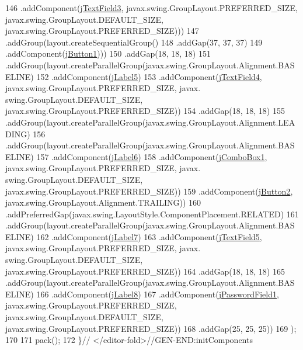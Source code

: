 \begin{DoxyCode}
146                             .addComponent(\mbox{\hyperlink{class_interfaz_package_1_1_interfaz_registro_a053413f2ec138bbb7914f22521b998f2}{jTextField3}}, javax.swing.GroupLayout.PREFERRED\_SIZE, 
      javax.swing.GroupLayout.DEFAULT\_SIZE, javax.swing.GroupLayout.PREFERRED\_SIZE)))
147                     .addGroup(layout.createSequentialGroup()
148                         .addGap(37, 37, 37)
149                         .addComponent(\mbox{\hyperlink{class_interfaz_package_1_1_interfaz_registro_a591a9233d6e086496804607414f1ccee}{jButton1}})))
150                 .addGap(18, 18, 18)
151                 .addGroup(layout.createParallelGroup(javax.swing.GroupLayout.Alignment.BASELINE)
152                     .addComponent(\mbox{\hyperlink{class_interfaz_package_1_1_interfaz_registro_a33ae73ec9abbf6e97467d9260b162c3e}{jLabel5}})
153                     .addComponent(\mbox{\hyperlink{class_interfaz_package_1_1_interfaz_registro_ac390d7bd629d29d59202c8b4fd60f46c}{jTextField4}}, javax.swing.GroupLayout.PREFERRED\_SIZE, javax.
      swing.GroupLayout.DEFAULT\_SIZE, javax.swing.GroupLayout.PREFERRED\_SIZE))
154                 .addGap(18, 18, 18)
155                 .addGroup(layout.createParallelGroup(javax.swing.GroupLayout.Alignment.LEADING)
156                     .addGroup(layout.createParallelGroup(javax.swing.GroupLayout.Alignment.BASELINE)
157                         .addComponent(\mbox{\hyperlink{class_interfaz_package_1_1_interfaz_registro_a49a5d1a1190e2cef3163a9b00fa76108}{jLabel6}})
158                         .addComponent(\mbox{\hyperlink{class_interfaz_package_1_1_interfaz_registro_a4c0ea8d0c8cbb3225b39b115bbd0416b}{jComboBox1}}, javax.swing.GroupLayout.PREFERRED\_SIZE, javax.
      swing.GroupLayout.DEFAULT\_SIZE, javax.swing.GroupLayout.PREFERRED\_SIZE))
159                     .addComponent(\mbox{\hyperlink{class_interfaz_package_1_1_interfaz_registro_aece6fd600c53e99fc2b9de62cfcbc0ae}{jButton2}}, javax.swing.GroupLayout.Alignment.TRAILING))
160                 .addPreferredGap(javax.swing.LayoutStyle.ComponentPlacement.RELATED)
161                 .addGroup(layout.createParallelGroup(javax.swing.GroupLayout.Alignment.BASELINE)
162                     .addComponent(\mbox{\hyperlink{class_interfaz_package_1_1_interfaz_registro_ad54a5088a93694070b1ff7162a917af7}{jLabel7}})
163                     .addComponent(\mbox{\hyperlink{class_interfaz_package_1_1_interfaz_registro_ad0d4eb99969584d92b6b857ad190d210}{jTextField5}}, javax.swing.GroupLayout.PREFERRED\_SIZE, javax.
      swing.GroupLayout.DEFAULT\_SIZE, javax.swing.GroupLayout.PREFERRED\_SIZE))
164                 .addGap(18, 18, 18)
165                 .addGroup(layout.createParallelGroup(javax.swing.GroupLayout.Alignment.BASELINE)
166                     .addComponent(\mbox{\hyperlink{class_interfaz_package_1_1_interfaz_registro_ab71462c00d6d77761293a3876adb4447}{jLabel8}})
167                     .addComponent(\mbox{\hyperlink{class_interfaz_package_1_1_interfaz_registro_af5d680c6a043e4e0a96fa3b93ad17cf0}{jPasswordField1}}, javax.swing.GroupLayout.PREFERRED\_SIZE, 
      javax.swing.GroupLayout.DEFAULT\_SIZE, javax.swing.GroupLayout.PREFERRED\_SIZE))
168                 .addGap(25, 25, 25))
169         );
170 
171         pack();
172     \}\textcolor{comment}{// </editor-fold>//GEN-END:initComponents}
\end{DoxyCode}
